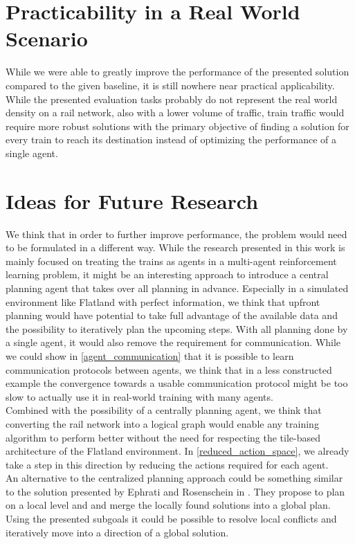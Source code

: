 \section{Practicability in a Real World Scenario}\label{discussion_real_world}
While we were able to greatly improve the performance of the presented solution compared to the given baseline, it is still nowhere near practical applicability. While the presented evaluation tasks probably do not represent the real world density on a rail network, also with a lower volume of traffic, train traffic would require more robust solutions with the primary objective of finding a solution for every train to reach its destination instead of optimizing the performance of a single agent.

\section{Ideas for Future Research}\label{discussion_research}
We think that in order to further improve performance, the problem would need to be formulated in a different way. While the research presented in this work is mainly focused on treating the trains as agents in a multi-agent reinforcement learning problem, it might be an interesting approach to introduce a central planning agent that takes over all planning in advance. Especially in a simulated environment like Flatland with perfect information, we think that upfront planning would have potential to take full advantage of the available data and the possibility to iteratively plan the upcoming steps. With all planning done by a single agent, it would also remove the requirement for communication. While we could show in \autoref{agent_communication} that it is possible to learn communication protocols between agents, we think that in a less constructed example the convergence towards a usable communication protocol might be too slow to actually use it in real-world training with many agents.\\
Combined with the possibility of a centrally planning agent, we think that converting the rail network into a logical graph would enable any training algorithm to perform better without the need for respecting the tile-based architecture of the Flatland environment. In \autoref{reduced_action_space}, we already take a step in this direction by reducing the actions required for each agent.\\
An alternative to the centralized planning approach could be something similar to the solution presented by Ephrati and Rosenschein in \cite{Ephrati1993MultiAgentPA}. They propose to plan on a local level and and merge the locally found solutions into a global plan. Using the presented subgoals it could be possible to resolve local conflicts and iteratively move into a direction of a global solution.